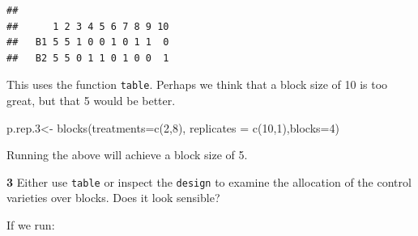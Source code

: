 \documentclass[
]{book}
\makeatletter
\newenvironment{Shaded}{\begin{snugshade}}{\end{snugshade}}
\newcommand{\AttributeTok}[1]{\textcolor[rgb]{0.77,0.63,0.00}{#1}}
\newcommand{\DecValTok}[1]{\textcolor[rgb]{0.00,0.00,0.81}{#1}}
\newcommand{\FloatTok}[1]{\textcolor[rgb]{0.00,0.00,0.81}{#1}}
\newcommand{\FunctionTok}[1]{\textcolor[rgb]{0.00,0.00,0.00}{#1}}
\newcommand{\NormalTok}[1]{#1}
\newcommand{\OtherTok}[1]{\textcolor[rgb]{0.56,0.35,0.01}{#1}}
\newcommand{\SpecialCharTok}[1]{\textcolor[rgb]{0.00,0.00,0.00}{#1}}
\newenvironment{kframe}{%
\medskip{}
\setlength{\fboxsep}{.8em}
 \def\at@end@of@kframe{}%
 \ifinner\ifhmode%
  \def\at@end@of@kframe{\end{minipage}}%
  \begin{minipage}{\columnwidth}%
 \fi\fi%
 \def\FrameCommand##1{\hskip\@totalleftmargin \hskip-\fboxsep
 \colorbox{shadecolor}{##1}\hskip-\fboxsep
     \hskip-\linewidth \hskip-\@totalleftmargin \hskip\columnwidth}%
 \MakeFramed {\advance\hsize-\width
   \@totalleftmargin\z@ \linewidth\hsize
   \@setminipage}}%
 {\par\unskip\endMakeFramed%
 \at@end@of@kframe}
\newenvironment{rmdblock}[1]
  {
  \begin{itemize}
  \renewcommand{\labelitemi}{
    \raisebox{-.7\height}[0pt][0pt]{
      {\setkeys{Gin}{width=3em,keepaspectratio}\texttt{[image: images/\#1]}}
    }
  }
  \setlength{\fboxsep}{1em}
  \begin{kframe}
  \item
  }
  {
  \end{kframe}
  \end{itemize}
  }
\newenvironment{rmdquiz}
  {\begin{rmdblock}{quiz}}
  {\end{rmdblock}}
\makeatother
\begin{document}
\begin{Shaded}
\end{Shaded}

\begin{verbatim}
##     
##      1 2 3 4 5 6 7 8 9 10
##   B1 5 5 1 0 0 1 0 1 1  0
##   B2 5 5 0 1 1 0 1 0 0  1
\end{verbatim}

This uses the function \texttt{table}. Perhaps we think that a block size of 10 is too great, but that 5 would be better.

\begin{Shaded}
\begin{Highlighting}[]
\NormalTok{p.rep}\FloatTok{.3}\OtherTok{\textless{}{-}} \FunctionTok{blocks}\NormalTok{(}\AttributeTok{treatments=}\FunctionTok{c}\NormalTok{(}\DecValTok{2}\NormalTok{,}\DecValTok{8}\NormalTok{), }\AttributeTok{replicates =} \FunctionTok{c}\NormalTok{(}\DecValTok{10}\NormalTok{,}\DecValTok{1}\NormalTok{),}\AttributeTok{blocks=}\DecValTok{4}\NormalTok{)}
\end{Highlighting}
\end{Shaded}

Running the above will achieve a block size of 5.

\begin{rmdquiz}
\textbf{3} Either use \texttt{table} or inspect the \texttt{design} to examine the allocation of the control varieties over blocks. Does it look sensible?
\end{rmdquiz}

If we run:

\begin{Shaded}
\end{Shaded}
\end{document}
